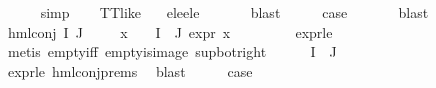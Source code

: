 \begin{isabellebody}
\ \ \ \ \isamarkupfalse%
\ simp{\isacharplus}{\kern0pt}\isanewline
\ \ \isamarkupfalse%
\ {\isachardoublequoteopen}TT{\isacharunderscore}{\kern0pt}like\ {\isasymphi}{\isachardoublequoteclose}\ \isamarkupfalse%
\ e{}{\isacharunderscore}{\kern0pt}le{\isacharunderscore}{\kern0pt}{}{\isacharunderscore}{\kern0pt}e{}{\isacharunderscore}{\kern0pt}le{\isacharunderscore}{\kern0pt}{}\ \isanewline
\ \ \ \ \isamarkupfalse%
\ blast\isanewline
\ \ \isamarkupfalse%
\ \isamarkupfalse%
\ {\isacharquery}{\kern0pt}case\ \isanewline
\ \ \ \ \isamarkupfalse%
\ blast\isanewline
{}\isamarkupfalse%
\isanewline
\ \ \isamarkupfalse%
\ {\isacharparenleft}{\kern0pt}hml{\isacharunderscore}{\kern0pt}conj\ I\ J\ {\isasymPhi}{\isacharparenright}{\kern0pt}\isanewline
\ \ \isamarkupfalse%
\ {\isachardoublequoteopen}{\isasymforall}x\ {\isasymin}\ {\isasymPhi}\ {\isacharbackquote}{\kern0pt}\ {\isacharparenleft}{\kern0pt}I\ {\isasymunion}\ J{\isacharparenright}{\kern0pt}{\isachardot}{\kern0pt}\ expr{\isacharunderscore}{\kern0pt}{}\ x\ {\isasymle}\ {}{\isachardoublequoteclose}\ \isanewline
\ \ \ \ \isamarkupfalse%
\ expr{\isacharunderscore}{\kern0pt}{}{\isacharunderscore}{\kern0pt}le{\isacharunderscore}{\kern0pt}{}\ \isanewline
\ \ \ \ \isamarkupfalse%
\ {\isacharparenleft}{\kern0pt}metis\ empty{\isacharunderscore}{\kern0pt}iff\ empty{\isacharunderscore}{\kern0pt}is{\isacharunderscore}{\kern0pt}image\ sup{\isacharunderscore}{\kern0pt}bot{\isacharunderscore}{\kern0pt}right{\isacharparenright}{\kern0pt}\isanewline
\ \ \isamarkupfalse%
\ {\isachardoublequoteopen}{\isasymPhi}\ {\isacharbackquote}{\kern0pt}\ {\isacharparenleft}{\kern0pt}I\ {\isasymunion}\ J{\isacharparenright}{\kern0pt}\ {\isacharequal}{\kern0pt}\ {\isacharbraceleft}{\kern0pt}{\isacharbraceright}{\kern0pt}{\isachardoublequoteclose}\ \isanewline
\ \ \ \ \isamarkupfalse%
\ expr{\isacharunderscore}{\kern0pt}{}{\isacharunderscore}{\kern0pt}le{\isacharunderscore}{\kern0pt}{}\ hml{\isacharunderscore}{\kern0pt}conj{\isachardot}{\kern0pt}prems{\isacharparenleft}{\kern0pt}{}{\isacharparenright}{\kern0pt}\ \isamarkupfalse%
\ blast\isanewline
\ \ \isamarkupfalse%
\ \isamarkupfalse%
\ {\isacharquery}{\kern0pt}case\ \isanewline
\ \ \ \ \isamarkupfalse%

\end{isabellebody}
